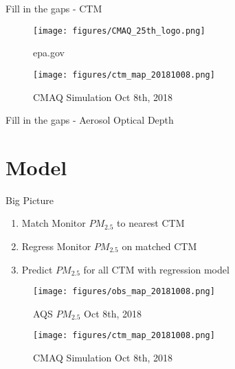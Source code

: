 \documentclass{beamer}
\begin{document}
\begin{frame}{Fill in the gaps - CTM}
    \begin{figure}
        \begin{minipage}{0.48\textwidth}
            \texttt{[image: figures/CMAQ\_25th\_logo.png]}
            \caption{epa.gov}
        \end{minipage}
        \hfill
        \begin{minipage}{0.48\textwidth}
            \texttt{[image: figures/ctm\_map\_20181008.png]}
            \caption{CMAQ Simulation Oct 8th, 2018}
        \end{minipage}
    \end{figure}
\end{frame}

\begin{frame}{Fill in the gaps - Aerosol Optical Depth}
\end{frame}

\section{Model}

\begin{frame}{Big Picture}
    \begin{enumerate}
        \item Match Monitor $PM_{2.5}$ to nearest CTM
        \item Regress Monitor $PM_{2.5}$ on matched CTM
        \item Predict $PM_{2.5}$ for all CTM with regression model
    \end{enumerate}
    \begin{figure}
        \begin{minipage}{0.48\textwidth}
            \texttt{[image: figures/obs\_map\_20181008.png]}
            \caption{AQS $PM_{2.5}$ Oct 8th, 2018}
        \end{minipage}
        \hfill
        \begin{minipage}{0.48\textwidth}
            \texttt{[image: figures/ctm\_map\_20181008.png]}
            \caption{CMAQ Simulation Oct 8th, 2018}
        \end{minipage}
    \end{figure}
\end{frame}
\end{document}
